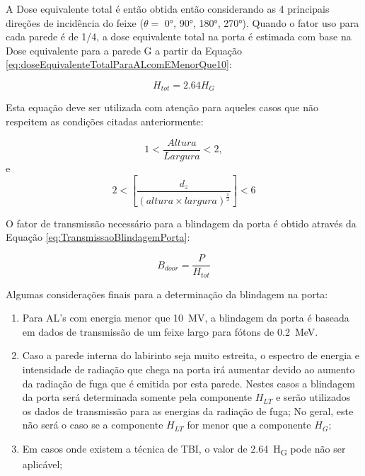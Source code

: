 \documentclass[11pt,a4paper]{article}
\begin{document}
            A Dose equivalente total é então obtida então considerando as 4 principais direções de incidência do feixe ($\theta = $ \ang{0}, \ang{90}, \ang{180}, \ang{270}).  Quando o fator uso para cada parede é de 1/4, a dose equivalente total na porta é estimada com base na Dose equivalente para a parede G a partir da Equação \ref{eq:doseEquivalenteTotalParaALcomEMenorQue10}:

                \begin{equation}
                     H_{tot} = 2.64 H_G
                    \label{eq:doseEquivalenteTotalParaALcomEMenorQue10}
                \end{equation}
                
            Esta equação deve ser utilizada com atenção para aqueles casos que não respeitem as condições citadas anteriormente: 

                $$1 < \frac{Altura}{Largura} < 2, $$ e
                $$2 < \left[\frac{d_z}{\left(altura \times largura\right)^\frac{1}{2}}\right] < 6$$

            O fator de transmissão necessário para a blindagem da porta é obtido através da Equação \ref{eq:TransmissaoBlindagemPorta}:

                \begin{equation}
                    B_{door} = \frac{P}{H_{tot}}
                    \label{eq:TransmissaoBlindagemPorta}
                \end{equation}
            

            Algumas considerações finais para a determinação da blindagem na porta:
            \begin{enumerate}
                \item Para AL's com energia menor que \qty{10}{MV}, a blindagem da porta é baseada em dados de transmissão de um feixe largo para fótons de \qty{0.2}{MeV}.
                \item Caso a parede interna do labirinto seja muito estreita, o espectro de energia e intensidade de radiação que chega na porta irá aumentar devido ao aumento da radiação de fuga que é emitida por esta parede. Nestes casos a blindagem da porta será determinada somente pela componente $H_{LT}$ e serão utilizados os dados de transmissão para as energias da radiação de fuga; No geral, este não será o caso se a componente $H_{LT}$ for menor que a componente $H_G$;
                \item Em casos onde existem a técnica de TBI, o valor de \qty{2.64}{H_G} pode não ser aplicável;
            \end{enumerate}
            






\end{document}
